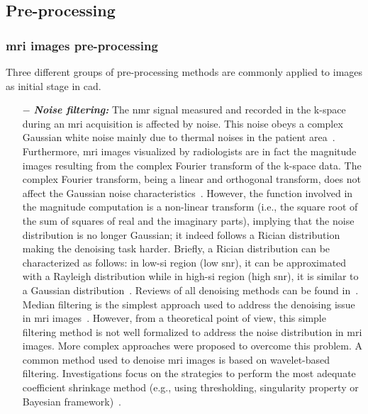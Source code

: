 \subsection{Pre-processing} \label{subsec:preprocessing}

\subsubsection{\ac{mri} images pre-processing}

Three different groups of pre-processing methods are commonly applied to images as initial stage in \ac{cad}.

\begin{enumerate}[leftmargin=*]

\item[$-$] \textbf{\textit{Noise filtering:}} The \ac{nmr} signal measured and recorded in the k-space during an \ac{mri} acquisition is affected by noise. This noise obeys a complex Gaussian white noise mainly due to thermal noises in the patient area~\cite{Nowak1999}. Furthermore, \ac{mri} images visualized by radiologists are in fact the magnitude images resulting from the complex Fourier transform of the k-space data. The complex Fourier transform, being a linear and orthogonal transform, does not affect the Gaussian noise characteristics~\cite{Nowak1999}. However, the function involved in the magnitude computation is a non-linear transform (i.e., the square root of the sum of squares of real and the imaginary parts), implying that the noise distribution is no longer Gaussian; it indeed follows a Rician distribution making the denoising task harder. Briefly, a Rician distribution can be characterized as follows: in low-\ac{si} region (low \ac{snr}), it can be approximated with a Rayleigh distribution while in high-\ac{si} region (high \ac{snr}), it is similar to a Gaussian distribution~\cite{Manjon2008}. Reviews of all denoising methods can be found in~\cite{Buades2005,Mohan2014}.
Median filtering is the simplest approach used to address the denoising issue in \ac{mri} images~\cite{Ozer2009,Ozer2010}. However, from a theoretical point of view, this simple filtering method is not well formalized to address the noise distribution in \ac{mri} images.
More complex approaches were proposed to overcome this problem. A common method used to denoise \ac{mri} images is based on wavelet-based filtering. Investigations focus on the strategies to perform the most adequate coefficient shrinkage method (e.g., using thresholding, singularity property or Bayesian framework)~\cite{Pizurica2002}.

\end{enumerate}
